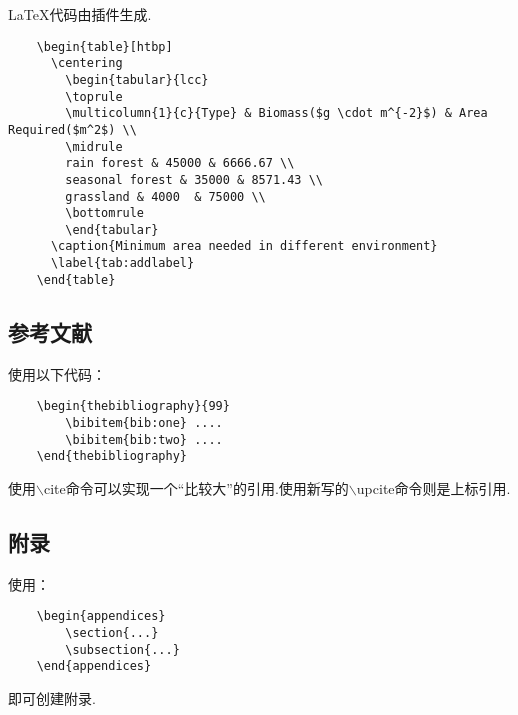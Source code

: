 \documentclass[bwprint, withouttitlepage, openfonts]{mathexpthesis}
\begin{document}
\LaTeX 代码由插件生成.
\begin{verbatim}
    \begin{table}[htbp]
      \centering
        \begin{tabular}{lcc}
        \toprule
        \multicolumn{1}{c}{Type} & Biomass($g \cdot m^{-2}$) & Area Required($m^2$) \\
        \midrule
        rain forest & 45000 & 6666.67 \\
        seasonal forest & 35000 & 8571.43 \\
        grassland & 4000  & 75000 \\
        \bottomrule
        \end{tabular}
      \caption{Minimum area needed in different environment}
      \label{tab:addlabel}
    \end{table}
\end{verbatim}

\subsection{参考文献}
使用以下代码：
\begin{verbatim}
    \begin{thebibliography}{99}
        \bibitem{bib:one} ....
        \bibitem{bib:two} ....
    \end{thebibliography}
\end{verbatim}

使用$\backslash$cite命令可以实现一个“比较大”的引用\cite{bib:one}.使用新写的$\backslash$upcite命令则是上标引用.

\subsection{附录}
使用：
\begin{verbatim}
    \begin{appendices}
        \section{...}
        \subsection{...}
    \end{appendices}
\end{verbatim}

即可创建附录.
\end{document}
